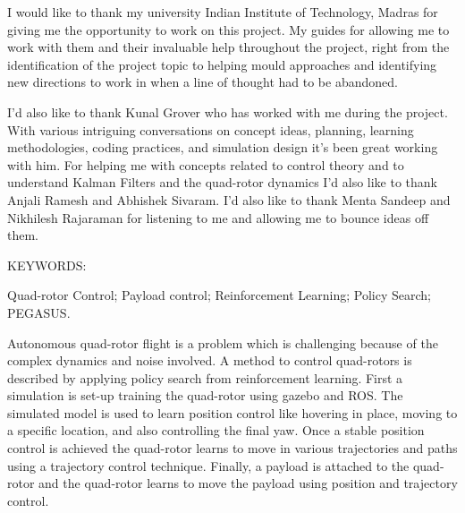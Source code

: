\documentclass[hidelinks,BTech]{iitmdiss}
\begin{document}
\acknowledgements

I would like to thank my university Indian Institute of Technology, Madras for giving me the opportunity to work on this project. My guides for allowing me to work with them and their invaluable help throughout the project, right from the identification of the project topic to helping mould approaches and identifying new directions to work in when a line of thought had to be abandoned.

I'd also like to thank Kunal Grover who has worked with me during the project. With various intriguing conversations on concept ideas, planning, learning methodologies, coding practices, and simulation design it's been great working with him. For helping me with concepts related to control theory and to understand Kalman Filters and the quad-rotor dynamics I'd also like to thank Anjali Ramesh and Abhishek Sivaram. I'd also like to thank Menta Sandeep and Nikhilesh Rajaraman for listening to me and allowing me to bounce ideas off them.


\abstract

\noindent KEYWORDS: \hspace*{0.5em} \parbox[t]{4.4in}{Quad-rotor Control; Payload control; Reinforcement Learning; Policy Search; PEGASUS.}

\vspace*{24pt}

\noindent Autonomous quad-rotor flight is a problem which is challenging because of the complex dynamics and noise involved. A method to control quad-rotors is described by applying policy search from reinforcement learning. First a simulation is set-up training the quad-rotor using gazebo and ROS. The simulated model is used to learn position control like hovering in place, moving to a specific location, and also controlling the final yaw. Once a stable position control is achieved the quad-rotor learns to move in various trajectories and paths using a trajectory control technique. Finally, a payload is attached to the quad-rotor and the quad-rotor learns to move the payload using position and trajectory control.

\pagebreak

\end{document}
